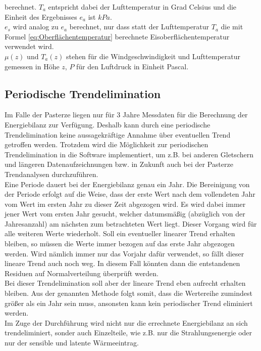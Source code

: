 \documentclass[11pt,a4paper]{article}
\begin{document}
berechnet. $T_a$ entspricht dabei der Lufttemperatur in Grad Celsius und die Einheit des Ergebnisses $e_a$ ist $kPa$.\\

$e_s$ wird analog zu $e_a$ berechnet, nur dass statt der Lufttemperatur $T_a$ die mit Formel \ref{eq:Oberflächentemperatur} berechnete Eisoberflächentemperatur verwendet wird.\\
$\mu(z)$ und $T_a(z)$ stehen für die Windgeschwindigkeit und Lufttemperatur gemessen in Höhe $z$, $P$ für den Luftdruck in Einheit Pascal.


\subsection{Periodische Trendelimination}\label{Periodische Trendelimination}
Im Falle der Pasterze liegen nur für 3 Jahre Messdaten für die Berechnung der Energiebilanz zur Verfügung. Deshalb kann durch eine periodische Trendelimination keine aussagekräftige Annahme über eventuellen Trend getroffen werden. Trotzdem wird die Möglichkeit zur periodischen Trendelimination in die Software implementiert, um z.B. bei anderen Gletschern und längeren Datenaufzeichnungen bzw. in Zukunft auch bei der Pasterze Trendanalysen durchzuführen.\\

Eine Periode dauert bei der Energiebilanz genau ein Jahr. Die Bereinigung von der Periode erfolgt auf die Weise, dass der erste Wert nach dem vollendeten Jahr vom Wert im ersten Jahr zu dieser Zeit abgezogen wird. Es wird dabei immer jener Wert vom ersten Jahr gesucht, welcher datumsmäßig (abzüglich von der Jahresanzahl) am nächsten zum betrachteten Wert liegt. Dieser Vorgang wird für alle weiteren Werte wiederholt. Soll ein eventueller linearer Trend erhalten bleiben, so müssen die Werte immer bezogen auf das erste Jahr abgezogen werden. Wird nämlich immer nur das Vorjahr dafür verwendet, so fällt dieser lineare Trend auch noch weg. In diesem Fall könnten dann die entstandenen Residuen auf Normalverteilung überprüft werden.\\
Bei dieser Trendelimination soll aber der lineare Trend eben aufrecht erhalten bleiben. Aus der genannten Methode folgt somit, dass die Wertereihe zumindest größer als ein Jahr sein muss, ansonsten kann kein periodischer Trend eliminiert werden.\\

Im Zuge der Durchführung wird nicht nur die errechnete Energiebilanz an sich trendeliminiert, sonder auch Einzelteile, wie z.B. nur die Strahlungsenergie oder nur der sensible und latente Wärmeeintrag.
\end{document}
